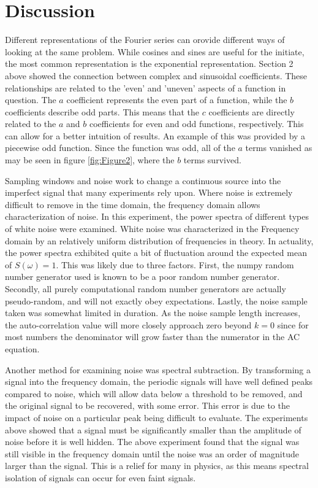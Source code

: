 \documentclass[twocolumn]{article}
\begin{document}
\section{Discussion}
Different representations of the Fourier series can orovide different ways of looking at the same problem. While cosines and sines are useful for the initiate, the most common representation is the exponential representation. Section 2 above showed the connection between complex and sinusoidal coefficients. These relationships are related to the 'even' and 'uneven' aspects of a function in question. The $a$ coefficient represents the even part of a function, while the $b$ coefficients describe odd parts. This means that the $c$ coefficients are directly related to the $a$ and $b$ coefficients for even and odd functions, respectively. This can allow for a better intuition of results. An example of this was provided by a piecewise odd function. Since the function was odd, all of the $a$ terms vanished as may be seen in figure \ref{fig:Figure2}, where the $b$ terms survived.

Sampling windows and noise work to change a continuous source into the imperfect signal that many experiments rely upon. Where noise is extremely difficult to remove in the time domain, the frequency domain allows characterization of noise. In this experiment, the power spectra of different types of white noise were examined. White noise was characterized in the Frequency domain by an relatively uniform distribution of frequencies in theory. In actuality, the power spectra exhibited quite a bit of fluctuation around the expected mean of $S(\omega)=1$. This was likely due to three factors. First, the numpy random number generator used is known to be a poor random number generator. Secondly, all purely computational random number generators are actually pseudo-random, and will not exactly obey expectations. Lastly, the noise sample taken was somewhat limited in duration. As the noise sample length increases, the auto-correlation value will more closely approach zero beyond $k=0$ since for most numbers the denominator will grow faster than the numerator in the AC equation. 

Another method for examining noise was spectral subtraction. By transforming a signal into the frequency domain, the periodic signals will have well defined peaks compared to noise, which will allow data below a threshold to be removed, and the original signal to be recovered, with some error. This error is due to the impact of noise on a particular peak being difficult to evaluate. The experiments above showed that a signal must be significantly smaller than the amplitude of noise before it is well hidden. The above experiment found that the signal was still visible in the frequency domain until the noise was an order of magnitude larger than the signal. This is a relief for many in physics, as this means spectral isolation of signals can occur for even faint signals.
\end{document}
